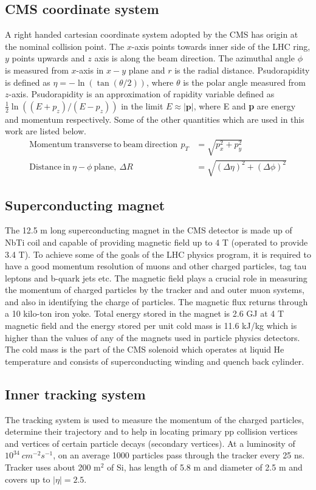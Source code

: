 \subsection{CMS coordinate system}
A right handed cartesian coordinate system adopted by the CMS has origin at the nominal collision point. The $x$-axis points towards inner 
side of the LHC ring, $y$ points upwards and $z$ axis is along the beam direction. The azimuthal angle $\phi$ is measured from $x$-axis in 
$x-y$ plane and $r$ is the radial distance. Psudorapidity is defined as $\eta = - \ln(\tan(\theta/2))$, where $\theta$ is the polar angle 
measured from $z$-axis. Psudorapidity is an approximation of rapidity variable defined as $\frac{1}{2}\ln((E+p_z)/(E-p_z))$ in the limit 
$E\approx |\textbf{p}|$, where E and \textbf{p} are energy and momentum respectively. Some of the other quantities which are used in this 
work are listed below.
\begin{align}
\mathrm{Momentum\ transverse\ to\ beam\ direction\,\ } p_T & = \sqrt{p_{x}^2 + p_{y}^2}\\
\mathrm{Distance\ in\ }\eta-\phi \ \mathrm{plane,}\ \Delta R & = \sqrt{(\Delta \eta)^2 + (\Delta \phi)^2}
\end{align}

\subsection{Superconducting magnet}
The 12.5 m long superconducting magnet in the CMS detector is made up of NbTi coil and capable of providing magnetic field up to 4 T 
(operated to provide 3.4 T). To achieve some of the goals of the LHC physics program, it is required 
to have a good momentum resolution of muons and other charged 
particles, tag tau leptons and b-quark jets etc. The magnetic field plays a crucial role in measuring the momentum of charged particles by 
the tracker and and outer muon systems, and also in identifying the charge of particles. The magnetic flux returns through a 10 kilo-ton 
iron yoke. Total energy stored in the magnet is 2.6 GJ at 4 T magnetic field and the energy stored per unit cold mass is 11.6 kJ/kg which 
is higher than the values of any of the magnets used in particle physics detectors. The cold mass is the part of the CMS solenoid which operates at liquid He temperature and consists of superconducting winding and quench back cylinder.
\subsection{Inner tracking system}
The tracking system is used to measure the momentum of the charged particles, determine their trajectory and to help in locating primary 
pp collision vertices and vertices of certain particle decays (secondary vertices). At a luminosity of $10^{34}\ cm^{-2}s^{-1}$, on an 
average 1000 particles pass through the tracker every 25 ns. 
Tracker uses about 200 m$^2$ of Si, has length of 5.8 m and diameter of 2.5 m and covers up to $|\eta| = 2.5$. 


